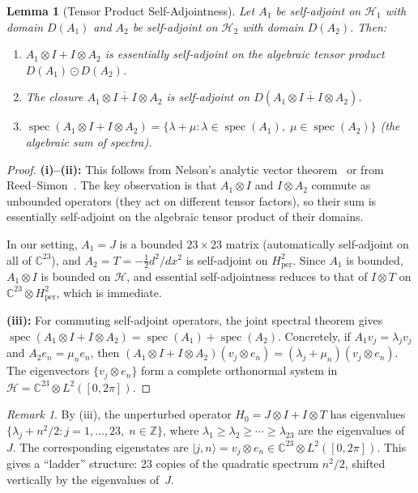 \documentclass[11pt,a4paper]{article}
\theoremstyle{plain}
\newtheorem{lemma}[theorem]{Lemma}
\theoremstyle{remark}
\newtheorem{remark}[theorem]{Remark}
\newcommand{\Z}{\mathbb{Z}}
\newcommand{\C}{\mathbb{C}}
\newcommand{\HH}{\mathcal{H}}
\DeclareMathOperator{\spec}{spec}
\begin{document}
\begin{lemma}[Tensor Product Self-Adjointness]\label{lem:tensor-sa}
Let $A_1$ be self-adjoint on $\HH_1$ with domain $D(A_1)$ and
$A_2$ be self-adjoint on $\HH_2$ with domain $D(A_2)$.  Then:
\begin{enumerate}[nosep,label=(\roman*)]
  \item $A_1\otimes I+I\otimes A_2$ is essentially self-adjoint on the
        algebraic tensor product $D(A_1)\odot D(A_2)$.
  \item The closure $\overline{A_1\otimes I+I\otimes A_2}$ is self-adjoint
        on $D(\overline{A_1\otimes I+I\otimes A_2})$.
  \item $\spec(A_1\otimes I+I\otimes A_2)
        =\{\lambda+\mu:\lambda\in\spec(A_1),\;\mu\in\spec(A_2)\}$
        (the algebraic sum of spectra).
\end{enumerate}
\end{lemma}

\begin{proof}
\textbf{(i)--(ii):} This follows from Nelson's analytic vector
theorem~\cite[Thm.~X.39]{reed-simon1975} or from
Reed--Simon~\cite[Thm.~VIII.33]{reed-simon1972}.
The key observation is that $A_1\otimes I$ and $I\otimes A_2$
commute as unbounded operators (they act on different tensor factors),
so their sum is essentially self-adjoint on the algebraic tensor product
of their domains.

In our setting, $A_1=J$ is a bounded $23\times 23$ matrix (automatically
self-adjoint on all of $\C^{23}$), and $A_2=T=-\tfrac{1}{2}d^2/dx^2$
is self-adjoint on $H^2_{\mathrm{per}}$.  Since $A_1$ is bounded,
$A_1\otimes I$ is bounded on $\HH$, and essential self-adjointness
reduces to that of $I\otimes T$ on $\C^{23}\otimes H^2_{\mathrm{per}}$,
which is immediate.

\textbf{(iii):} For commuting self-adjoint operators, the joint spectral
theorem gives $\spec(A_1\otimes I+I\otimes A_2)=\spec(A_1)+\spec(A_2)$.
Concretely, if $A_1 v_j=\lambda_j v_j$ and $A_2 e_n=\mu_n e_n$,
then $(A_1\otimes I+I\otimes A_2)(v_j\otimes e_n)=(\lambda_j+\mu_n)(v_j\otimes e_n)$.
The eigenvectors $\{v_j\otimes e_n\}$ form a complete orthonormal system
in $\HH=\C^{23}\otimes L^2([0,2\pi])$.
\end{proof}

\begin{remark}\label{rem:H0-spectrum}
By (iii), the unperturbed operator $H_0=J\otimes I+I\otimes T$
has eigenvalues $\{\lambda_j+n^2/2:j=1,\ldots,23,\;n\in\Z\}$, where
$\lambda_1\geq\lambda_2\geq\cdots\geq\lambda_{23}$ are the eigenvalues
of~$J$.  The corresponding eigenstates are
$|j,n\rangle=v_j\otimes e_n\in\C^{23}\otimes L^2([0,2\pi])$.
This gives a ``ladder'' structure: 23 copies of the quadratic spectrum
$n^2/2$, shifted vertically by the eigenvalues of~$J$.
\end{remark}
\end{document}
